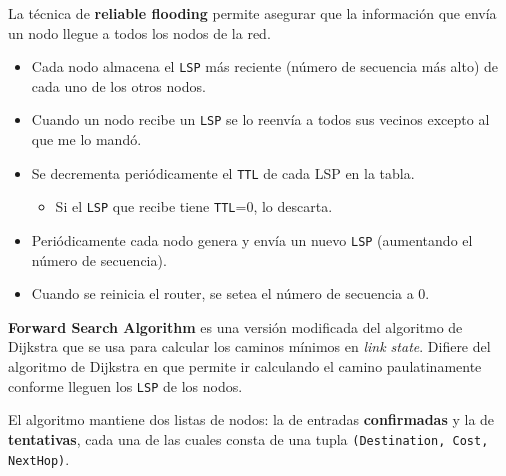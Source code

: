 \documentclass[]{article}
\begin{document}
La técnica de \textbf{reliable flooding} permite asegurar que la información que envía un nodo llegue a todos los nodos de la red.

\begin{itemize}
    \item Cada nodo almacena el \texttt{LSP} más reciente (número de secuencia más alto) de cada uno de los otros nodos.
    \item Cuando un nodo recibe un \texttt{LSP} se lo reenvía a todos sus vecinos excepto al que me lo mandó.
	\item Se decrementa periódicamente el \texttt{TTL} de cada LSP en la tabla.
    \begin{itemize}
        \item Si el \texttt{LSP} que recibe tiene \texttt{TTL}=0, lo descarta.
    \end{itemize}
    \item Periódicamente cada nodo genera y envía un nuevo \texttt{LSP} (aumentando el número de secuencia).
    \item Cuando se reinicia el router, se setea el número de secuencia a 0.
\end{itemize}


\textbf{Forward Search Algorithm} es una versión modificada del algoritmo de Dijkstra que se usa para calcular los caminos mínimos en \emph{link state}. Difiere del algoritmo de Dijkstra en que permite ir calculando el camino paulatinamente conforme lleguen los \texttt{LSP} de los nodos.

El algoritmo mantiene dos listas de nodos: la de entradas \textbf{confirmadas} y la de \textbf{tentativas}, cada una de las cuales consta de una tupla \texttt{(Destination, Cost, NextHop)}.







\end{document}
